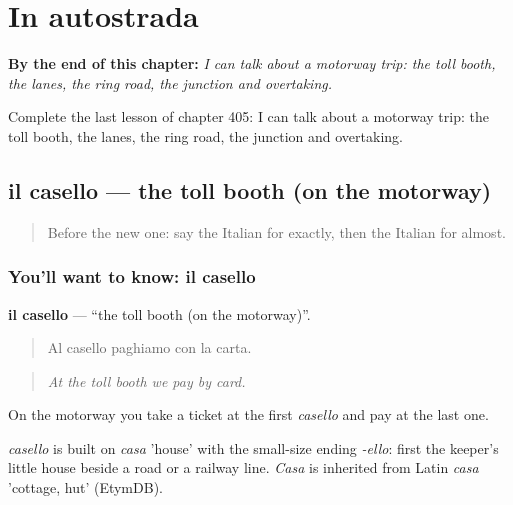 
\chapter{In autostrada}
\label{ch:it-in-autostrada}

\begin{chapteropening}
\textbf{By the end of this chapter:} \emph{I can talk about a motorway trip: the toll booth, the lanes, the ring road, the junction and overtaking.}

Complete the last lesson of chapter 405: I can talk about a motorway trip: the toll booth, the lanes, the ring road, the junction and overtaking.
\end{chapteropening}

\section[il casello]{il casello — the toll booth (on the motorway)}

\label{lesson:IT-C405-casello}



\begin{quote}
Before the new one: say the Italian for exactly, then the Italian for almost.
\end{quote}

\subsection*{You'll want to know: il casello}
\textbf{il casello} — \textquotedblleft{}the toll booth (on the motorway)\textquotedblright{}.

\begin{quote}
Al casello paghiamo con la carta.
\end{quote}

\begin{quote}
\emph{At the toll booth we pay by card.}
\end{quote}

On the motorway you take a ticket at the first \emph{casello} and pay at the last one.

\begin{cousinweb}
\emph{casello} is built on \emph{casa} 'house' with the small-size ending \emph{-ello}: first the keeper's little house beside a road or a railway line. \emph{Casa} is inherited from Latin \emph{casa} 'cottage, hut' (EtymDB).
\end{cousinweb}

